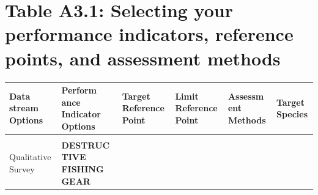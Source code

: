 \documentclass[]{book}
\begin{document}
\section{Table A3.1: Selecting your performance indicators, reference
points, and assessment
methods}\label{table-a3.1-selecting-your-performance-indicators-reference-points-and-assessment-methods}

\begin{longtable}[]{@{}llllll@{}}
\toprule
\begin{minipage}[b]{0.14\columnwidth}\raggedright\strut
\textbf{Data stream Options}\strut
\end{minipage} & \begin{minipage}[b]{0.14\columnwidth}\raggedright\strut
\textbf{Perform ance Indicator Options}\strut
\end{minipage} & \begin{minipage}[b]{0.14\columnwidth}\raggedright\strut
\textbf{Target Reference Point}\strut
\end{minipage} & \begin{minipage}[b]{0.14\columnwidth}\raggedright\strut
\textbf{Limit Reference Point}\strut
\end{minipage} & \begin{minipage}[b]{0.14\columnwidth}\raggedright\strut
\textbf{Assessm ent Methods}\strut
\end{minipage} & \begin{minipage}[b]{0.14\columnwidth}\raggedright\strut
\textbf{Target Species}\strut
\end{minipage}\tabularnewline
\midrule
\endhead
\begin{minipage}[t]{0.14\columnwidth}\raggedright\strut
\strut
\end{minipage} & \begin{minipage}[t]{0.14\columnwidth}\raggedright\strut
\strut
\end{minipage} & \begin{minipage}[t]{0.14\columnwidth}\raggedright\strut
\strut
\end{minipage} & \begin{minipage}[t]{0.14\columnwidth}\raggedright\strut
\strut
\end{minipage} & \begin{minipage}[t]{0.14\columnwidth}\raggedright\strut
\strut
\end{minipage} & \begin{minipage}[t]{0.14\columnwidth}\raggedright\strut
\strut
\end{minipage}\tabularnewline
\begin{minipage}[t]{0.16\columnwidth}\raggedright\strut
Qualitative Survey\strut
\end{minipage} & \begin{minipage}[t]{0.16\columnwidth}\raggedright\strut
\textbf{DESTRUC TIVE FISHING GEAR}


\end{minipage}
\end{longtable}
\end{document}
